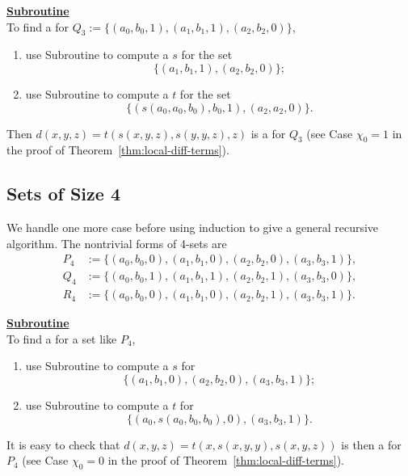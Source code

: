   
  \noindent \underline{\textbf{Subroutine }}\\[4pt]
  To find a \ldto for
  $Q_3 := \{(a_0, b_0, 1), (a_1, b_1, 1), (a_2, b_2, 0)\}$,
  \begin{enumerate}
  \item \label{item:001-1}
  use Subroutine  to compute a \ldto $s$ for the set
  \begin{equation*}
  \{(a_1, b_1, 1), (a_2, b_2, 0)\};
  \end{equation*}
  \item \label{item:001-2} use Subroutine  to compute a \ldto $t$
  for the set
  \begin{equation*}
  \{(s(a_0, a_0, b_0), b_0, 1),  (a_2,a_2,0)\}.
  \end{equation*}
  \end{enumerate}
  Then
  $d(x,y,z) = t(s(x,y,z), s(y,y,z),z)$
  is a \ldto  for $Q_3$ (see Case $\chi_0=1$ in the proof of Theorem~\ref{thm:local-diff-terms}).
  
  \subsection{Sets of Size 4} We handle one more case before
  using induction to give a general recursive algorithm.
  The nontrivial forms of 4-sets are
  \begin{align*}
  P_4 &:= \{(a_0, b_0, 0), (a_1, b_1, 0),  (a_2, b_2, 0),  (a_3, b_3, 1)\},\\
  Q_4 &:= \{(a_0, b_0, 1), (a_1, b_1, 1), (a_2, b_2, 1), (a_3, b_3, 0)\},\\
  R_4 &:= \{(a_0, b_0, 0), (a_1, b_1, 0),  (a_2, b_2, 1),  (a_3, b_3, 1)\}.
  \end{align*}
  
  \medskip
  
  \noindent \underline{\textbf{Subroutine }}\\[4pt]
  To find a \ldto for a set like $P_4$,
  \begin{enumerate}
  \item use Subroutine  to compute a \ldto $s$ for
  \begin{equation*}
  \{(a_1, b_1, 0),  (a_2, b_2, 0),  (a_3, b_3, 1)\};
  \end{equation*}
  \item use Subroutine  to compute a \ldto $t$ for
  \begin{equation*}
  \{(a_0, s(a_0, b_0, b_0), 0), (a_3, b_3, 1)\}.
  \end{equation*}
  \end{enumerate}
  It is easy to check that
  $d(x,y,z) = t(x, s(x,y,y), s(x,y,z))$
  is then a \ldto for $P_4$
  (see Case $\chi_0=0$ in the proof of Theorem~\ref{thm:local-diff-terms}).
  
